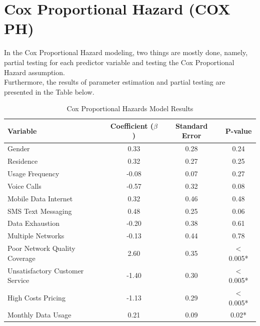 \documentclass[doublespacing,12pt]{report}
\begin{document}
\section{Cox Proportional Hazard (COX PH)}

In the Cox Proportional Hazard modeling, two things are mostly done, namely, partial testing for each predictor variable and testing the Cox Proportional Hazard assumption.\\
Furthermore, the results of parameter estimation and partial testing are presented in the Table below.


\begin{table}[H]
\centering
\begin{tabular}{lccc}
\toprule
Variable & Coefficient ($\beta$) & Standard Error & P-value\\
\midrule
Gender & 0.33 & 0.28 & 0.24 \\
Residence & 0.32 & 0.27 & 0.25 \\
Usage Frequency & -0.08 & 0.07 & 0.27 \\
Voice Calls & -0.57 & 0.32 & 0.08 \\
Mobile Data Internet & 0.32 & 0.46 & 0.48 \\
SMS Text Messaging & 0.48 & 0.25 & 0.06 \\
Data Exhaustion & -0.20 & 0.38 & 0.61 \\
Multiple Networks & -0.13 & 0.44 & 0.78 \\
Poor Network Quality Coverage & 2.60 & 0.35 & $<$0.005*\\
Unsatisfactory Customer Service & -1.40 & 0.30 & $<$0.005*\\
High Costs Pricing & -1.13 & 0.29 & $<$0.005*\\
Monthly Data Usage & 0.21 & 0.09 & 0.02*\\
\bottomrule
\end{tabular}
\caption{Cox Proportional Hazards Model Results}
\label{tab:cox_ph_results}
\end{table}
\end{document}
